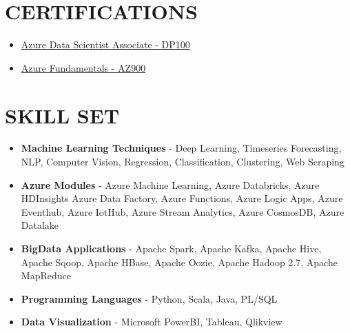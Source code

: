 \documentclass[11pt,a4paper,roman]{moderncv}        %
\begin{document}
\section{CERTIFICATIONS}
{\begin{itemize}
    \item {\href{https://www.credly.com/badges/a6183143-bff0-41e2-b81c-c2879f50c19d/public_url}{Azure Data Scientist Associate - DP100}}
    \item {\href{https://www.credly.com/badges/e2f12548-835d-4d8f-9355-0a157df89709/public_url}{Azure Fundamentals - AZ900}} 
\end{itemize}}



\section{SKILL SET}
{\begin{itemize}
  \item \textbf{Machine Learning Techniques} - Deep Learning, Timeseries Forecasting, NLP, Computer Vision, Regression, Classification, Clustering, Web Scraping
  \item \textbf{Azure Modules} - Azure Machine Learning, Azure Databricks, Azure HDInsights Azure Data Factory, Azure Functions, Azure Logic Apps, Azure Eventhub, Azure IotHub, Azure Stream Analytics, Azure CosmosDB, Azure Datalake
  \item \textbf{BigData Applications} - Apache Spark, Apache Kafka, Apache Hive, Apache Sqoop, Apache HBase, Apache Oozie, Apache Hadoop 2.7, Apache MapReduce
  \item \textbf{Programming Languages} - Python, Scala, Java, PL/SQL
  \item \textbf{Data Visualization} - Microsoft PowerBI, Tableau, Qlikview
\end{itemize}
}
\end{document}
